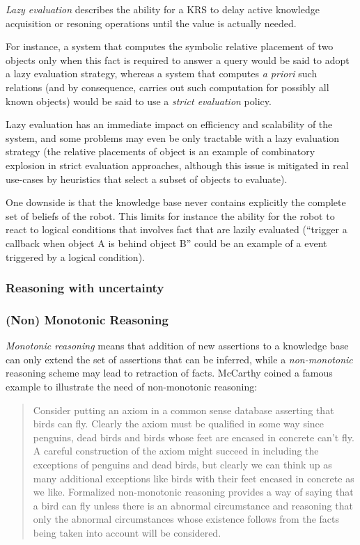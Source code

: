 \documentclass[a4paper, twocolumn]{article}
\begin{document}
\emph{Lazy evaluation} describes the ability for a KRS to delay active
knowledge acquisition or resoning operations until the value is actually
needed.

For instance, a system that computes the symbolic relative placement of two
objects only when this fact is required to answer a query would be said to
adopt a lazy evaluation strategy, whereas a system that computes {\it a priori}
such relations (and by consequence, carries out such computation for possibly
all known objects) would be said to use a \emph{strict evaluation} policy.

Lazy evaluation has an immediate impact on efficiency and scalability of the
system, and some problems may even be only tractable with a lazy evaluation
strategy (the relative placements of object is an example of combinatory
explosion in strict evaluation approaches, although this issue is mitigated in
real use-cases by heuristics that select a subset of objects to evaluate).

One downside is that the knowledge base never contains explicitly the complete
set of beliefs of the robot. This limits for instance the ability for the robot
to react to logical conditions that involves fact that are lazily evaluated
(``trigger a callback when object A is behind object B'' could be an example of
a event triggered by a logical condition).

\subsubsection{Reasoning with uncertainty}


\subsubsection{(Non) Monotonic Reasoning}

\emph{Monotonic reasoning} means that addition of new assertions to a knowledge base
can only extend the set of assertions that can be inferred, while a
\emph{non-monotonic} reasoning scheme may lead to retraction of facts.
McCarthy coined a famous example to illustrate the need of non-monotonic reasoning:

\begin{quotation}
Consider putting an axiom in a common sense database asserting that birds can
fly. Clearly the axiom must be qualified in some way since penguins, dead birds
and birds whose feet are encased in concrete can't fly. A careful construction
of the axiom might succeed in including the exceptions of penguins and dead
birds, but clearly we can think up as many additional exceptions like birds
with their feet encased in concrete as we like. Formalized non-monotonic
reasoning provides a way of saying that a bird can fly unless there
is an abnormal circumstance and reasoning that only the abnormal circumstances
whose existence follows from the facts being taken into account will be
considered.
\end{quotation}
\end{document}
